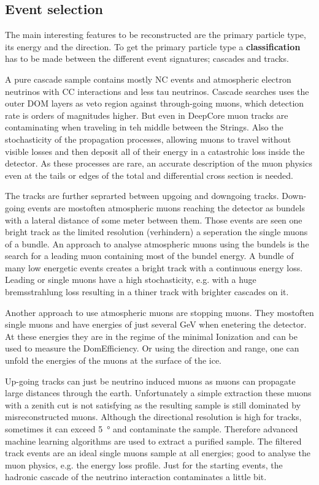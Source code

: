 \subsection{Event selection}

The main interesting features to be reconstructed are the primary particle type, its energy and the direction.
To get the primary particle type a \textbf{classification} has to be made between the different event signatures; cascades and tracks.

A pure cascade sample contains mostly NC events and atmospheric electron neutrinos with CC interactions and less tau neutrinos.
Cascade searches uses the outer DOM layers as veto region against through-going muons, which detection rate is orders of magnitudes higher.
But even in DeepCore muon tracks are contaminating when traveling in teh middle between the Strings.
Also the stochasticity of the propagation processes, allowing muons to travel without visible losses and then deposit all of their energy in a catastrohic loss inside the detector.
As these processes are rare, an accurate description of the muon physics even at the tails or edges of the total and differential cross section is needed.

The tracks are further seprarted between upgoing and downgoing tracks.
Down-going events are mostoften atmospheric muons reaching the detector as bundels with a lateral distance of some meter between them.
Those events are seen one bright track as the limited resolution (verhindern) a seperation the single muons of a bundle.
An approach to analyse atmospheric muons using the bundels is the search for a leading muon containing most of the bundel energy.
A bundle of many low energetic events creates a bright track with a continuous energy loss.
Leading or single muons have a high stochasticity, e.g. with a huge bremsstrahlung loss resulting in a thiner track with brighter cascades on it.

Another approach to use atmospheric muons are stopping muons.
They mostoften single muons and have energies of just several GeV when enetering the detector.
At these energies they are in the regime of the minimal Ionization and can be used to measure the DomEfficiency.
Or using the direction and range, one can unfold the energies of the muons at the surface of the ice.

Up-going tracks can just be neutrino induced muons as muons can propagate large distances through the earth.
Unfortunately a simple extraction these muons with a zenith cut is not satisfying as the resulting sample is still dominated by misreconstructed muons.
Although the directional resolution is high for tracks, sometimes it can exceed \SI{5}{\degree} and contaminate the sample.
Therefore advanced machine learning algorithms are used to extract a purified sample.
The filtered track events are an ideal single muons sample at all energies; good to analyse the muon physics, e.g. the energy loss profile.
Just for the starting events, the hadronic cascade of the neutrino interaction contaminates a little bit.

